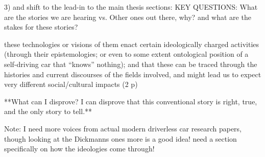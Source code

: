 3) and shift to the lead-in to the main thesis sections: 
KEY QUESTIONS: What are the stories we are hearing vs. Other ones out
there, why? and what are the stakes for these stories?

these technologies or visions of them enact certain ideologically charged
activities (through their epistemologies; or even to some extent
ontological position of a self-driving car that ``knows'' nothing);
and that these can be traced through the histories and current
discourses of the fields involved, and might lead us to expect very
different social/cultural impacts (2 p)

**What can I disprove?
I can disprove that this conventional story is right, true, and the
only story to tell.**

Note: I need more voices from actual modern driverless car research
papers, though looking at the Dickmanns ones more is a good idea! need
a section specifically on how the ideologies come through!

